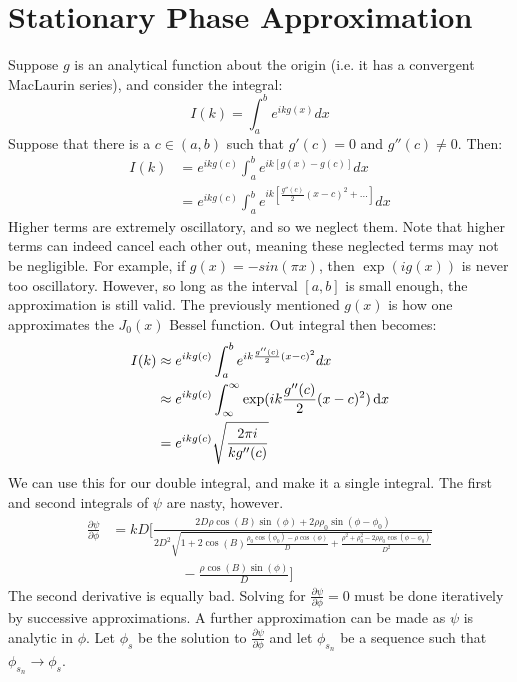 \section{Stationary Phase Approximation}
    Suppose $g$ is an analytical function about
    the origin (i.e. it has a convergent MacLaurin series),
    and consider the integral:
    \begin{equation}
        I(k) = \int_{a}^{b}e^{ikg(x)}dx
    \end{equation}
    Suppose that there is a $c\in(a,b)$ such
    that $g'(c)=0$ and $g''(c)\ne 0$. Then:
    \begin{align}
        \nonumber I(k)&=e^{ikg(c)}\int_{a}^{b}e^{ik[g(x)-g(c)]}dx\\
        &=e^{ikg(c)}\int_{a}^{b}e^{ik[\frac{g''(c)}{2}(x-c)^{2}+\hdots]}dx
    \end{align}
    Higher terms are extremely oscillatory, and so we neglect them.
    Note that higher terms can indeed cancel each
    other out, meaning these neglected terms may
    not be negligible. For example, if
    $g(x)=-sin(\pi x)$, then $\exp(ig(x))$ is never
    too oscillatory. However, so long as the interval
    $[a,b]$ is small enough, the approximation is still
    valid. The previously mentioned $g(x)$ is how
    one approximates the $J_{0}(x)$ Bessel function.
    Out integral then becomes:
    \begin{align}
        I(k)&\approx e^{ikg(c)}
                \int_{a}^{b}e^{ik\frac{g''(c)}{2}(x-c)^{2}}dx\\
            &\approx e^{ikg(c)}
                \int_{\infty}^{\infty}
                \exp(ik\frac{g''(c)}{2}(x-c)^{2})\mathop{}\!\mathrm{d}{x}\\
            &=e^{ikg(c)}\sqrt{\frac{2\pi i}{kg''(c)}}
    \end{align}
    We can use this for our double integral,
    and make it a single integral. The first and
    second integrals of $\psi$ are nasty, however.
    \begin{equation}
        \begin{split}
            \frac{\partial\psi}{\partial\phi}
            &=kD\Big[\frac{2D\rho\cos(B)
                \sin(\phi)+2\rho\rho_{0}
            \sin(\phi-\phi_{0})}{2D^2\sqrt{1+2\cos(B)
            \frac{\rho_{0}\cos(\phi_{0})-\rho\cos(\phi)}{D}+
            \frac{\rho^{2}+\rho_{0}^{2}-
            2\rho\rho_{0}\cos(\phi-\phi_{0})}{D^2}}}\\
            &\quad\quad\quad\quad\quad
            -\frac{\rho\cos(B)\sin(\phi)}{D}\Big]
        \end{split}
    \end{equation}
    The second derivative is equally bad.
    Solving for $\frac{\partial\psi}{\partial\phi}=0$
    must be done iteratively by successive approximations.
    A further approximation can be made as $\psi$
    is analytic in $\phi$. Let $\phi_{s}$ be
    the solution to $\frac{\partial\psi}{\partial\phi}$
    and let $\phi_{s_{n}}$ be a sequence such that
    $\phi_{s_{n}}\rightarrow\phi_{s}$.
